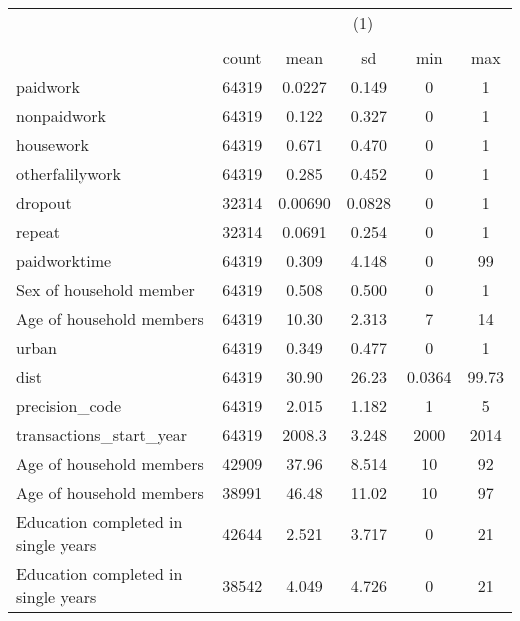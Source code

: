 {
\def\sym#1{\ifmmode^{#1}\else\(^{#1}\)\fi}
\begin{tabular}{l*{1}{ccccc}}
\toprule
                    &\multicolumn{5}{c}{(1)}                                         \\
                    &\multicolumn{5}{c}{}                                            \\
                    &       count&        mean&          sd&         min&         max\\
\midrule
paidwork            &       64319&      0.0227&       0.149&           0&           1\\
nonpaidwork         &       64319&       0.122&       0.327&           0&           1\\
housework           &       64319&       0.671&       0.470&           0&           1\\
otherfalilywork     &       64319&       0.285&       0.452&           0&           1\\
dropout             &       32314&     0.00690&      0.0828&           0&           1\\
repeat              &       32314&      0.0691&       0.254&           0&           1\\
paidworktime        &       64319&       0.309&       4.148&           0&          99\\
Sex of household member&       64319&       0.508&       0.500&           0&           1\\
Age of household members&       64319&       10.30&       2.313&           7&          14\\
urban               &       64319&       0.349&       0.477&           0&           1\\
dist                &       64319&       30.90&       26.23&      0.0364&       99.73\\
precision\_code      &       64319&       2.015&       1.182&           1&           5\\
transactions\_start\_year&       64319&      2008.3&       3.248&        2000&        2014\\
Age of household members&       42909&       37.96&       8.514&          10&          92\\
Age of household members&       38991&       46.48&       11.02&          10&          97\\
Education completed in single years&       42644&       2.521&       3.717&           0&          21\\
Education completed in single years&       38542&       4.049&       4.726&           0&          21\\
\bottomrule
\end{tabular}
}
